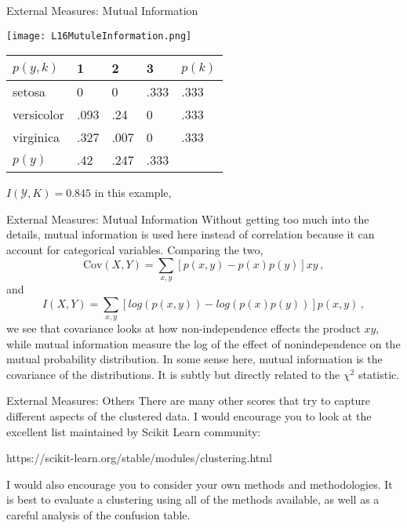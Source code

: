 \documentclass[10pt, table, dvipsnames,xcdraw,handout]{beamer}
\newcommand{\cY}{\ensuremath{\mathcal{Y}}}
\begin{document}
\begin{frame}[fragile]{External Measures: Mutual Information}
  \begin{minipage}[t][0.5\textheight][t]{\textwidth}
	\centering \texttt{[image: L16MutuleInformation.png]} 
  \end{minipage}
  \vfill
\begin{minipage}[t][0.5\textheight][t]{\textwidth}
\begin{table}[]
\begin{tabular}{l|lll|l}
$p(y,k)$   & 1    & 2    & 3    & $p(k)$ \\ \hline
setosa     & 0    & 0    & .333 & .333   \\
versicolor & .093 & .24  & 0    & .333   \\
virginica  & .327 & .007 & 0    & .333   \\ \hline
$p(y)$     & .42  & .247 & .333 &       
\end{tabular}
\end{table}
$I(\cY, K) = 0.845$ in this example, 
\end{minipage}
\end{frame}



\begin{frame}[fragile]{External Measures: Mutual Information}
Without getting too much into the details, mutual information is used here instead of correlation because it can account for categorical variables. \pause Comparing the two, 
$$
\text{Cov}(X,Y) = \sum_{x,y}[p(x,y) - p(x)p(y)]xy\,,
$$
and 
$$
I(X,Y) = \sum_{x,y}[log(p(x,y)) - log(p(x)p(y))]p(x,y)\,,
$$\pause
we see that covariance looks at how non-independence effects the product $xy$, while mutual information measure the log of the effect of nonindependence on the mutual probability distribution. \pause In some sense here, mutual information is the covariance of the distributions.  It is subtly but directly related to the $\chi^2$ statistic. 
\end{frame}





\begin{frame}[fragile]{External Measures: Others}
There are many other scores that try to capture different aspects of the clustered data. I would encourage you to look at the excellent list maintained by Scikit Learn community:

https://scikit-learn.org/stable/modules/clustering.html

I would also encourage you to consider your own methods and methodologies. It is best to evaluate a clustering using all of the methods available, as well as a careful analysis of the confusion table. 
\end{frame}
\end{document}

